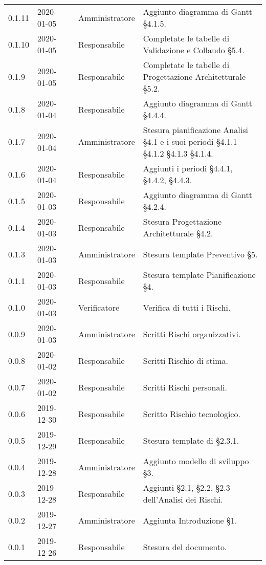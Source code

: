 {\begin{longtable}{C{2cm} C{2cm}  C{3cm}  C{3cm} C{4.5cm}}
0.1.11 & 2020-01-05 & \LD{} & Amministratore & Aggiunto diagramma di Gantt §4.1.5. \\
0.1.10 & 2020-01-05 & \SE{} & Responsabile & Completate le tabelle di Validazione e Collaudo §5.4.\\
0.1.9 & 2020-01-05 & \SE{} & Responsabile & Completate le tabelle di Progettazione Architetturale §5.2. \\
0.1.8 & 2020-01-04 & \SE{} & Responsabile & Aggiunto diagramma di Gantt §4.4.4. \\
0.1.7 & 2020-01-04 & \LD{} & Amministratore & Stesura pianificazione Analisi §4.1 e i suoi periodi §4.1.1 §4.1.2 §4.1.3 §4.1.4. \\
0.1.6 & 2020-01-04 & \SE{} & Responsabile & Aggiunti i periodi §4.4.1, §4.4.2, §4.4.3. \\
0.1.5 & 2020-01-03 & \SE{} & Responsabile & Aggiunto diagramma di Gantt §4.2.4. \\
0.1.4 & 2020-01-03 & \SE{} & Responsabile & Stesura Progettazione Architetturale §4.2.\\
0.1.3 & 2020-01-03 & \LD{} & Amministratore & Stesura template Preventivo §5. \\
0.1.1 & 2020-01-03 &  \SE{} & Responsabile & Stesura template Pianificazione §4. \\
0.1.0 & 2020-01-03 &\AT{} & Verificatore & Verifica di tutti i Rischi. \\
0.0.9 & 2020-01-03 & \LD{} & Amministratore & Scritti Rischi organizzativi. \\
0.0.8 & 2020-01-02 &  \SE{} & Responsabile & Scritti Rischio di stima. \\
0.0.7 & 2020-01-02 & \SE{} & Responsabile & Scritti Rischi personali. \\
0.0.6 & 2019-12-30 & \SE{} & Responsabile & Scritto Rischio tecnologico. \\
0.0.5 & 2019-12-29 & \SE{} & Responsabile & Stesura template di §2.3.1. \\
0.0.4 & 2019-12-28 & \LD{} & Amministratore & Aggiunto modello di sviluppo §3. \\
0.0.3 & 2019-12-28 & \SE{} & Responsabile & Aggiunti §2.1, §2.2, §2.3 dell'Analisi dei Rischi. \\
0.0.2 & 2019-12-27 & \LD{} & Amministratore & Aggiunta Introduzione §1. \\
0.0.1 & 2019-12-26 & \SE{} & Responsabile & Stesura del documento. \\
		
\end{longtable}
}